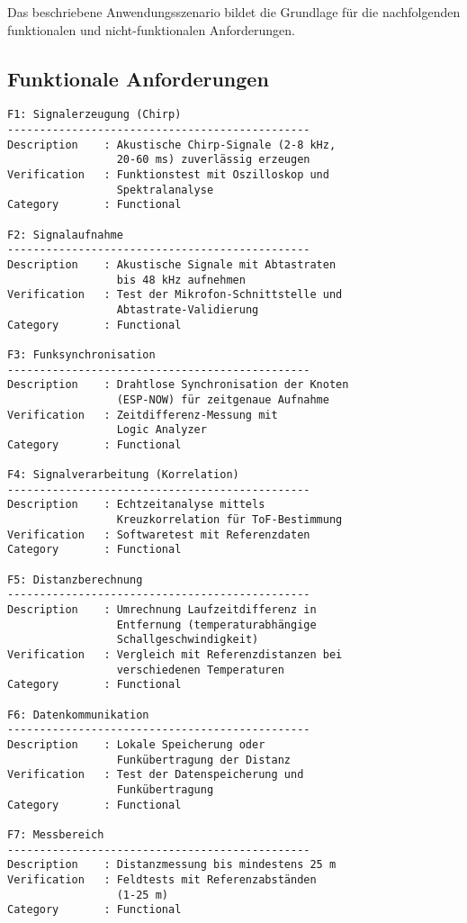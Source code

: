 Das beschriebene Anwendungsszenario bildet die Grundlage für die nachfolgenden funktionalen und nicht-funktionalen Anforderungen.



\subsection{Funktionale Anforderungen}

\begin{verbatim}
F1: Signalerzeugung (Chirp)
-----------------------------------------------
Description    : Akustische Chirp-Signale (2-8 kHz, 
                 20-60 ms) zuverlässig erzeugen
Verification   : Funktionstest mit Oszilloskop und 
                 Spektralanalyse
Category       : Functional

F2: Signalaufnahme
-----------------------------------------------
Description    : Akustische Signale mit Abtastraten 
                 bis 48 kHz aufnehmen
Verification   : Test der Mikrofon-Schnittstelle und
                 Abtastrate-Validierung
Category       : Functional

F3: Funksynchronisation
-----------------------------------------------
Description    : Drahtlose Synchronisation der Knoten
                 (ESP-NOW) für zeitgenaue Aufnahme
Verification   : Zeitdifferenz-Messung mit 
                 Logic Analyzer
Category       : Functional

F4: Signalverarbeitung (Korrelation)
-----------------------------------------------
Description    : Echtzeitanalyse mittels 
                 Kreuzkorrelation für ToF-Bestimmung
Verification   : Softwaretest mit Referenzdaten
Category       : Functional

F5: Distanzberechnung
-----------------------------------------------
Description    : Umrechnung Laufzeitdifferenz in 
                 Entfernung (temperaturabhängige 
                 Schallgeschwindigkeit)
Verification   : Vergleich mit Referenzdistanzen bei
                 verschiedenen Temperaturen
Category       : Functional

F6: Datenkommunikation
-----------------------------------------------
Description    : Lokale Speicherung oder 
                 Funkübertragung der Distanz
Verification   : Test der Datenspeicherung und 
                 Funkübertragung
Category       : Functional

F7: Messbereich
-----------------------------------------------
Description    : Distanzmessung bis mindestens 25 m
Verification   : Feldtests mit Referenzabständen 
                 (1-25 m)
Category       : Functional
\end{verbatim}


